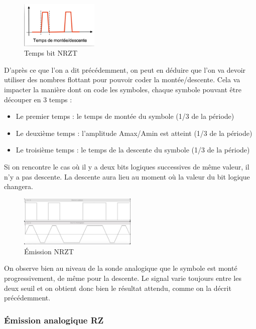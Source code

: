 \begin{figure}[H]
    \centering
    \includegraphics[width=0.33\textwidth]{img/etape2_temps_NRZT.png}
    \caption{Temps bit NRZT}
    \label{fig:emission_nrzt}
\end{figure}

D’après ce que l’on a dit précédemment, on peut en déduire que l’on va devoir utiliser des nombres flottant pour pouvoir coder la montée/descente. Cela va impacter la manière dont on code les symboles, chaque symbole pouvant être découper en 3 temps :

\begin{itemize}
    \item Le premier temps : le temps de montée du symbole (1/3 de la période)
    \item Le deuxième temps : l’amplitude Amax/Amin est atteint (1/3 de la période)
    \item Le troisième temps : le temps de la descente du symbole (1/3 de la période)
\end{itemize}

Si on rencontre le cas où il y a deux bits logiques successives de même valeur, il n’y a pas descente. La descente aura lieu au moment où la valeur du bit logique changera.

\begin{figure}[H]
    \centering
    \includegraphics[width=0.5\textwidth]{img/etape2_emission_NRZT.png}
    \caption{Émission NRZT}
    \label{fig:emission_nrzt}
\end{figure}

On observe bien au niveau de la sonde analogique que le symbole est monté progressivement, de même pour la descente. Le signal varie toujours entre les deux seuil et on obtient donc bien le résultat attendu, comme on la décrit précédemment.



\subsubsection{Émission analogique RZ}

